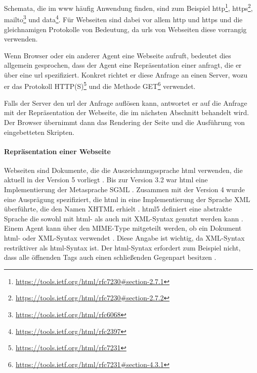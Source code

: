             Schemata, die im \gls{www} häufig Anwendung finden,
            sind zum Beispiel
            http\footnote{\url{https://tools.ietf.org/html/rfc7230\#section-2.7.1}},
            https\footnote{\url{https://tools.ietf.org/html/rfc7230\#section-2.7.2}},
            mailto\footnote{\url{https://tools.ietf.org/html/rfc6068}} und
            data\footnote{\url{https://tools.ietf.org/html/rfc2397}}.
            Für Webseiten sind dabei vor allem http und https
            und die gleichnamigen Protokolle von Bedeutung,
            da \glspl{url} von Webseiten diese vorrangig verwenden.

            Wenn Browser oder ein anderer Agent eine Webseite aufruft,
            bedeutet dies allgemein gesprochen, dass der Agent eine Repräsentation
            einer {\resource} anfragt, die er über eine \gls{url} spezifiziert.
            Konkret richtet er diese Anfrage an einen Server,
            wozu er das Protokoll HTTP(S)\footnote{\url{https://tools.ietf.org/html/rfc7231}} und die Methode
            GET\footnote{\url{https://tools.ietf.org/html/rfc7231\#section-4.3.1}} verwendet.

            Falls der Server den \gls{url} der Anfrage auflösen kann,
            antwortet er auf die Anfrage mit der Repräsentation der Webseite,
            die im nächsten Abschnitt behandelt wird.
            Der Browser übernimmt dann das Rendering der Seite und die Ausführung
            von eingebetteten Skripten.


            \paragraph*{Repräsentation einer Webseite}
            Webseiten sind Dokumente, die die Auszeichnungssprache \gls{html} verwenden,
            die aktuell in der Version 5 vorliegt \cite{w3c:html5}.
            Bis zur Version 3.2 war \gls{html} eine Implementierung der Metasprache SGML \cite{w3c:html401}.
            Zusammen mit der Version 4 wurde eine Ausprägung spezifiziert,
            die \gls{html} in eine Implementierung der Sprache XML überführte,
            die den Namen XHTML erhielt \cite{w3c:xhtml}.
            \gls{html}5 definiert eine abstrakte Sprache
            die sowohl mit \gls{html}- als auch mit XML-Syntax genutzt werden kann
            \cite[Kapitel 1.6]{w3c:html5}.
            Einem Agent kann über den MIME-Type mitgeteilt werden,
            ob ein Dokument \gls{html}- oder XML-Syntax verwendet \cite[Kapitel 1.6]{w3c:html5}.
            Diese Angabe ist wichtig, da XML-Syntax restriktiver als \gls{html}-Syntax ist.
            Der \gls{html}-Syntax erfordert zum Beispiel nicht,
            dass alle öffnenden Tags auch einen schließenden Gegenpart besitzen
            \cite[Kapitel 3.2.3]{w3c:html5}.
            
